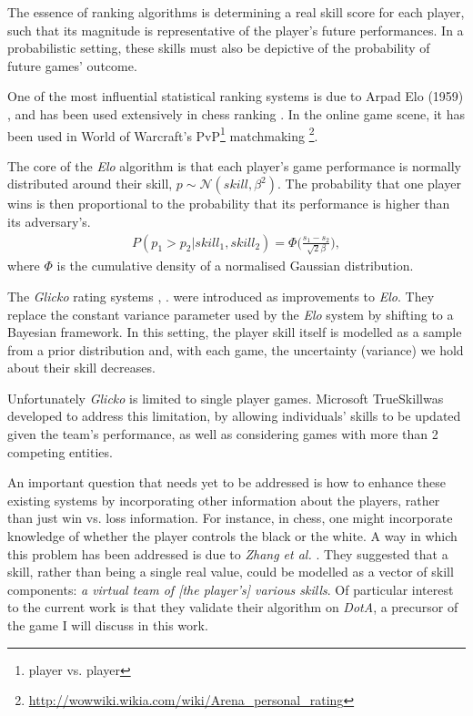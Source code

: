 \documentclass[10pt,a4]{article}
\begin{document}
The essence of ranking algorithms is determining a real skill score for each 
player, such that its magnitude is representative of the player's future 
performances. In a probabilistic setting, these skills must also be depictive of 
the probability of future games' outcome.

One of the most influential statistical ranking systems is due to Arpad Elo (1959) 
\cite{elo1978rating}, and has been used extensively in chess ranking 
\cite{glickman1995comprehensive}. In the online game scene, it has been used in 
World of Warcraft's PvP\footnote{player vs. player} matchmaking 
\footnote{\url{http://wowwiki.wikia.com/wiki/Arena_personal_rating}}. 

The core of the \emph{Elo} algorithm is that each player's game performance  
is normally distributed around their skill, $p \sim \mathcal{N}(skill, \beta^2)$.
The probability that one player wins is then proportional to the probability that 
its performance is higher than its adversary's.
\begin{align*}
	P(p_1 > p_2 | skill_1, skill_2) = \Phi\bigg(\frac{s_1 - s_2}{\sqrt{2}\beta}\bigg),
\end{align*}
where $\Phi$ is the cumulative density of a normalised Gaussian distribution. 


The \emph{Glicko} rating systems \cite{glickman1999parameter}, \cite{glickman2012example}. 
were introduced as improvements to \emph{Elo}. 
They replace the constant variance parameter used by the
\emph{Elo} system by shifting to a Bayesian framework. In this setting, the player skill itself 
is modelled as a sample from a prior distribution and, with each game, the uncertainty 
(variance) we hold about their skill decreases. 

Unfortunately \emph{Glicko} is limited to single player games. Microsoft 
TrueSkill\texttrademark  was developed to address this limitation, by allowing 
individuals' skills to be updated given the team's performance, as well as considering
games with more than 2 competing entities.

An important question that needs yet to be addressed is how to enhance these existing
systems by incorporating other information about the players, rather than just 
win vs. loss information. For instance, in chess, one might incorporate knowledge of whether 
the player controls the black or the white. 
A way in which this problem has been addressed is due to \emph{Zhang et al.} 
\cite{zhang2010factor}. They suggested that a skill, rather than being 
a single real value, could be modelled as a vector of skill components: \emph{
a virtual team of [the player's] various skills}. Of particular interest to the 
current work is that they validate their algorithm on \emph{DotA}, a precursor of 
the game I will discuss in this work.
\end{document}
